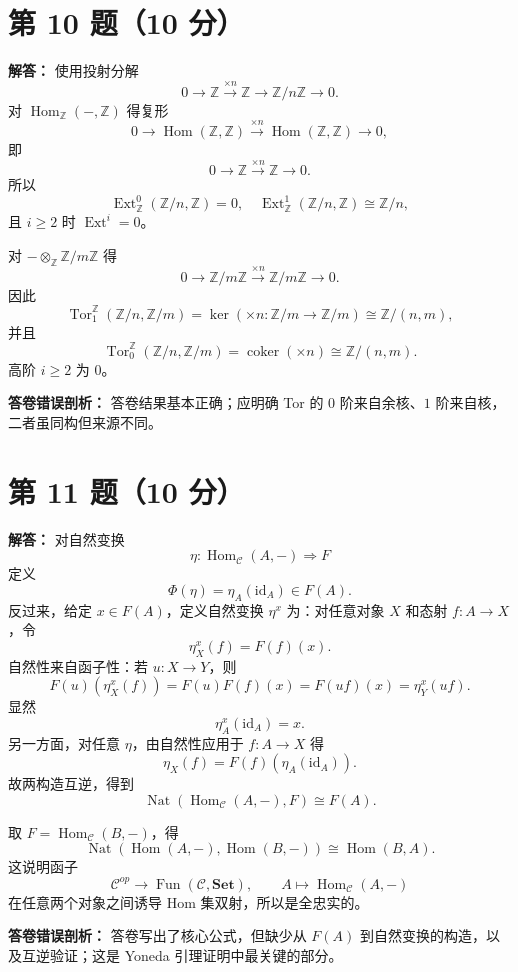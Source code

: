 \documentclass[11pt]{article}
\begin{document}
\section*{第 10 题（10 分）}

\textbf{解答：}
使用投射分解
\[
  0\to\mathbb Z\xrightarrow{\times n}\mathbb Z\to\mathbb Z/n\mathbb Z\to0.
\]
对 \(\operatorname{Hom}_{\mathbb Z}(-,\mathbb Z)\) 得复形
\[
  0\to\operatorname{Hom}(\mathbb Z,\mathbb Z)
  \xrightarrow{\times n}
  \operatorname{Hom}(\mathbb Z,\mathbb Z)\to0,
\]
即
\[
  0\to\mathbb Z\xrightarrow{\times n}\mathbb Z\to0.
\]
所以
\[
  \operatorname{Ext}^0_{\mathbb Z}(\mathbb Z/n,\mathbb Z)=0,\quad
  \operatorname{Ext}^1_{\mathbb Z}(\mathbb Z/n,\mathbb Z)\cong\mathbb Z/n,
\]
且 \(i\ge2\) 时 \(\operatorname{Ext}^i=0\)。

对 \(-\otimes_{\mathbb Z}\mathbb Z/m\mathbb Z\) 得
\[
  0\to \mathbb Z/m\mathbb Z
  \xrightarrow{\times n}
  \mathbb Z/m\mathbb Z\to0.
\]
因此
\[
  \operatorname{Tor}_1^{\mathbb Z}(\mathbb Z/n,\mathbb Z/m)
  =
  \ker(\times n:\mathbb Z/m\to\mathbb Z/m)
  \cong \mathbb Z/(n,m),
\]
并且
\[
  \operatorname{Tor}_0^{\mathbb Z}(\mathbb Z/n,\mathbb Z/m)
  =
  \operatorname{coker}(\times n)
  \cong \mathbb Z/(n,m).
\]
高阶 \(i\ge2\) 为 \(0\)。

\textbf{答卷错误剖析：}
答卷结果基本正确；应明确 Tor 的 \(0\) 阶来自余核、\(1\) 阶来自核，二者虽同构但来源不同。

\section*{第 11 题（10 分）}

\textbf{解答：}
对自然变换
\[
  \eta:\operatorname{Hom}_{\mathcal C}(A,-)\Rightarrow F
\]
定义
\[
  \Phi(\eta)=\eta_A(\mathrm{id}_A)\in F(A).
\]
反过来，给定 \(x\in F(A)\)，定义自然变换 \(\eta^x\) 为：对任意对象 \(X\) 和态射 \(f:A\to X\)，令
\[
  \eta^x_X(f)=F(f)(x).
\]
自然性来自函子性：若 \(u:X\to Y\)，则
\[
  F(u)(\eta^x_X(f))=F(u)F(f)(x)=F(uf)(x)=\eta^x_Y(uf).
\]
显然
\[
  \eta^x_A(\mathrm{id}_A)=x.
\]
另一方面，对任意 \(\eta\)，由自然性应用于 \(f:A\to X\) 得
\[
  \eta_X(f)=F(f)(\eta_A(\mathrm{id}_A)).
\]
故两构造互逆，得到
\[
  \operatorname{Nat}(\operatorname{Hom}_{\mathcal C}(A,-),F)\cong F(A).
\]

取 \(F=\operatorname{Hom}_{\mathcal C}(B,-)\)，得
\[
  \operatorname{Nat}(\operatorname{Hom}(A,-),\operatorname{Hom}(B,-))
  \cong
  \operatorname{Hom}(B,A).
\]
这说明函子
\[
  \mathcal C^{op}\to\operatorname{Fun}(\mathcal C,\mathbf{Set}),
  \qquad A\mapsto\operatorname{Hom}_{\mathcal C}(A,-)
\]
在任意两个对象之间诱导 Hom 集双射，所以是全忠实的。

\textbf{答卷错误剖析：}
答卷写出了核心公式，但缺少从 \(F(A)\) 到自然变换的构造，以及互逆验证；这是 Yoneda 引理证明中最关键的部分。
\end{document}
